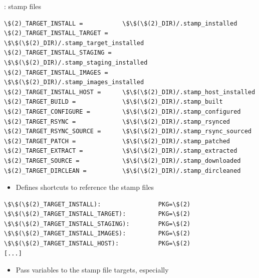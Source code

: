 \begin{frame}[fragile]{: stamp files}

\begin{block}{}
\begin{verbatim}
\$(2)_TARGET_INSTALL =           \$\$(\$(2)_DIR)/.stamp_installed
\$(2)_TARGET_INSTALL_TARGET =    \$\$(\$(2)_DIR)/.stamp_target_installed
\$(2)_TARGET_INSTALL_STAGING =   \$\$(\$(2)_DIR)/.stamp_staging_installed
\$(2)_TARGET_INSTALL_IMAGES =    \$\$(\$(2)_DIR)/.stamp_images_installed
\$(2)_TARGET_INSTALL_HOST =      \$\$(\$(2)_DIR)/.stamp_host_installed
\$(2)_TARGET_BUILD =             \$\$(\$(2)_DIR)/.stamp_built
\$(2)_TARGET_CONFIGURE =         \$\$(\$(2)_DIR)/.stamp_configured
\$(2)_TARGET_RSYNC =             \$\$(\$(2)_DIR)/.stamp_rsynced
\$(2)_TARGET_RSYNC_SOURCE =      \$\$(\$(2)_DIR)/.stamp_rsync_sourced
\$(2)_TARGET_PATCH =             \$\$(\$(2)_DIR)/.stamp_patched
\$(2)_TARGET_EXTRACT =           \$\$(\$(2)_DIR)/.stamp_extracted
\$(2)_TARGET_SOURCE =            \$\$(\$(2)_DIR)/.stamp_downloaded
\$(2)_TARGET_DIRCLEAN =          \$\$(\$(2)_DIR)/.stamp_dircleaned
\end{verbatim}
\end{block}

\begin{itemize}
\item Defines shortcuts to reference the stamp files
\end{itemize}

\begin{block}{}
\begin{verbatim}
\$\$(\$(2)_TARGET_INSTALL):                PKG=\$(2)
\$\$(\$(2)_TARGET_INSTALL_TARGET):         PKG=\$(2)
\$\$(\$(2)_TARGET_INSTALL_STAGING):        PKG=\$(2)
\$\$(\$(2)_TARGET_INSTALL_IMAGES):         PKG=\$(2)
\$\$(\$(2)_TARGET_INSTALL_HOST):           PKG=\$(2)
[...]
\end{verbatim}
\end{block}

\begin{itemize}
\item Pass variables to the stamp file targets, especially 
\end{itemize}

\end{frame}

